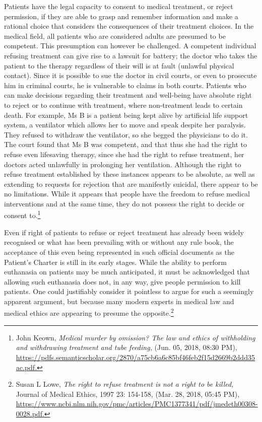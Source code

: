 \begin{multicols}{2}
\noi
Patients have the legal capacity to consent to medical treatment, or reject permission, if they
are able to grasp and remember information and make a rational choice that considers the
consequences of their treatment choices. In the medical field, all patients who are considered
adults are presumed to be competent. This presumption can however be challenged. A
competent individual refusing treatment can give rise to a lawsuit for battery; the doctor who
takes the patient to the therapy regardless of their will is at fault (unlawful physical contact).
Since it is possible to sue the doctor in civil courts, or even to prosecute him in criminal
courts, he is vulnerable to claims in both courts. Patients who can make decisions regarding
their treatment and well-being have absolute right to reject or to continue with treatment,
where non-treatment leads to certain death. For example, Ms B is a patient being kept alive
by artificial life support system, a ventilator which allows her to move and speak despite her
paralysis. They refused to withdraw the ventilator, so she begged the physicians to do it. The
court found that Ms B was competent, and that thus she had the right to refuse even lifesaving therapy, since she had the right to refuse treatment, her doctors acted unlawfully in
prolonging her ventilation. Although the right to refuse treatment established by these
instances appears to be absolute, as well as extending to requests for rejection that are
manifestly suicidal, there appear to be no limitations. While it appears that people have the
freedom to refuse medical interventions and at the same time, they do not possess the right to
decide or consent to.\footnote{John Keown, \textit{Medical murder by omission? The law and ethics of withholding and withdrawing treatment and tube feeding,} (Jun. 05, 2018, 08:30 PM),  \url{https://pdfs.semanticscholar.org/2870/a75cb6a6c85bf46feb2f15d2669b2ddd35ac.pdf.}}


\noi
Even if right of patients to refuse or reject treatment has already been widely recognised or
what has been prevailing with or without any rule book, the acceptance of this even being
represented in such official documents as the Patient's Charter is still in its early stages.
While the ability to perform euthanasia on patients may be much anticipated, it must be
acknowledged that allowing such euthanasia does not, in any way, give people permission to
kill patients. One could justifiably consider it pointless to argue for such a seemingly apparent argument, but because many modern experts in medical law and medical ethics are
appearing to presume the opposite.\footnote{Susan L Lowe, \textit{The right to refuse treatment is not a right to be killed,} Journal of Medical Ethics, 1997 23: 154-158, (Mar. 28, 2018, 05:45 PM),  \url{https://www.ncbi.nlm.nih.gov/pmc/articles/PMC1377341/pdf/jmedeth00308-0028.pdf.}}


\end{multicols}
